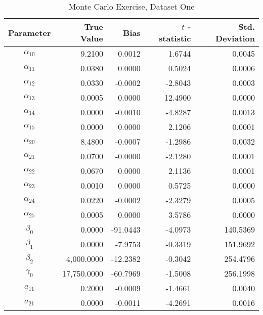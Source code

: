 \begin{table}\onehalfspacing
\begin{center}
\begin{threeparttable}
  \caption{Monte Carlo Exercise, Dataset One}
  \label{Monte Carlo: One}
  \begin{tabular}{crrrr}\toprule

  Parameter & True Value & Bias & $t$ - statistic & Std. Deviation \\
  \midrule
  $\alpha_{10}$ &     \phantom{20000}9.2100 &    \phantom{-17}0.0012 &     1.6744 &      0.0045 \\
  $\alpha_{11}$ &     0.0380 &      0.0000 &      0.5024 &       0.0006 \\
  $\alpha_{12}$ &     0.0330 &     -0.0002 &     -2.8043 &       0.0003 \\
  $\alpha_{13}$ &     0.0005 &      0.0000 &     12.4900 &       0.0000 \\
  $\alpha_{14}$ &     0.0000 &     -0.0010 &     -4.8287 &       0.0013 \\
  $\alpha_{15}$ &     0.0000 &      0.0000 &      2.1206 &       0.0001 \\
  $\alpha_{20}$ &     8.4800 &     -0.0007 &     -1.2986 &       0.0032 \\
  $\alpha_{21}$ &     0.0700 &     -0.0000 &     -2.1280 &       0.0001 \\
  $\alpha_{22}$ &     0.0670 &     0.0000  &        2.1136  &        0.0001 \\
  $\alpha_{23}$ &     0.0010 &     0.0000  &        0.5725  &        0.0000\\
  $\alpha_{24}$ &     0.0220 &    -0.0002  &       -2.3279  &        0.0005 \\
  $\alpha_{25}$ &     0.0005 &     0.0000  &        3.5786  &        0.0000\\
  $\beta_{0}$   &     0.0000 &    -91.0443 &     -4.0973 &     140.5369 \\
  $\beta_{1}$   &     0.0000 &     -7.9753 &     -0.3319 &     151.9692 \\
  $\beta_{2}$   &  4,000.0000 &   -12.2382 &     -0.3042 &     254.4796 \\
  $\gamma_{0}$  & 17,750.0000 &   -60.7969 &     -1.5008 &     256.1998 \\
  $a_{11}$      &     0.2000 &     -0.0009 &     -1.4661 &       0.0040 \\
  $a_{21}$      &     0.0000 &     -0.0011 &     -4.2691 &       0.0016 \\

\end{tabular}
\end{threeparttable}
\end{center}
\end{table}
